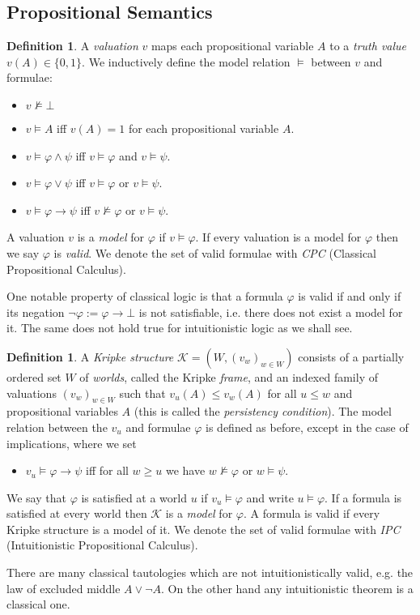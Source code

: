 \documentclass{easychair}
\theoremstyle{definition}
\theoremstyle{definition}
\theoremstyle{definition}
\theoremstyle{definition}
\theoremstyle{definition}
\newtheorem{definition}[theorem]{Definition}
\theoremstyle{definition}
\theoremstyle{definition}
\begin{document}
\subsection{Propositional Semantics}

\begin{definition}
	A \emph{valuation} $v$ maps each propositional variable $A$ to a \emph{truth value} $v(A)\in\{0, 1\}$. We inductively define the model relation $\models$ between $v$ and formulae:
	\begin{itemize}
		\item $v\not\models \bot$
		\item $v\models A$ iff $v(A) = 1$ for each propositional variable $A$.
		\item $v\models \varphi\wedge\psi$ iff $v\models\varphi$ and $v\models\psi$.
		\item $v\models\varphi\vee\psi$ iff $v\models\varphi$ or $v\models\psi$.
		\item $v\models\varphi\to \psi$ iff $v\not\models\varphi$ or $v\models\psi$.
	\end{itemize}
	A valuation $v$ is a \emph{model} for $\varphi$ if $v\models\varphi$. If every valuation is a model for $\varphi$ then we say $\varphi$ is \emph{valid}. We denote the set of valid formulae with \emph{CPC} (Classical Propositional Calculus).
\end{definition}

One notable property of classical logic is that a formula $\varphi$ is valid if and only if its negation $\neg\varphi := \varphi\to\bot$ is not satisfiable, i.e. there does not exist a model for it. The same does not hold true for intuitionistic logic as we shall see.

\begin{definition}
	A \emph{Kripke structure} $\mathcal K = (W, (v_w)_{w\in W})$ consists of a partially ordered set $W$ of \emph{worlds}, called the Kripke \emph{frame}, and an indexed family of valuations $(v_w)_{w\in W}$ such that $v_u(A)\leq v_w(A)$ for all $u\leq w$ and propositional variables $A$ (this is called the \emph{persistency condition}).
	The model relation between the $v_u$ and formulae $\varphi$ is defined as before, except in the case of implications, where we set
	\begin{itemize}
		\item $v_u\models\varphi\to \psi$ iff for all $w\geq u$ we have $w\not\models\varphi$ or $w\models\psi$.
	\end{itemize}
	We say that $\varphi$ is satisfied at a world $u$ if $v_u\models\varphi$ and write $u\models\varphi$. If a formula is satisfied at every world then $\mathcal K$ is a \emph{model} for $\varphi$. A formula is valid if every Kripke structure is a model of it. We denote the set of valid formulae with \emph{IPC} (Intuitionistic Propositional Calculus).
\end{definition}
There are many classical tautologies which are not intuitionistically valid, e.g. the law of excluded middle $A\vee\neg A$. On the other hand any intuitionistic theorem is a classical one.
\end{document}
